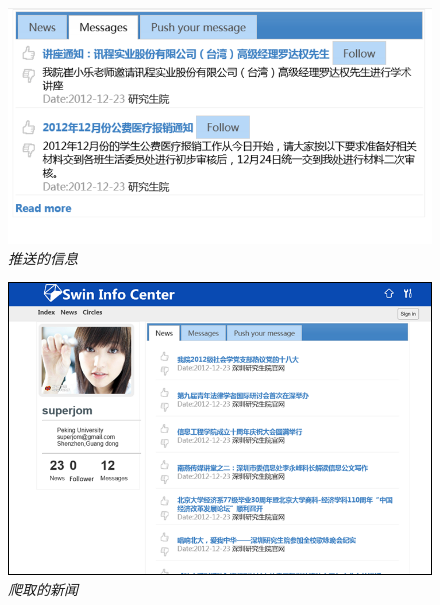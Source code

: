 \documentclass[a4paper]{ctexart}
\begin{document}
    \begin{figure}[htpb]
        \centering
        \includegraphics{File5.png}
        \caption{\small \sl 推送的信息}
        \label{fig:pushed-message}
    \end{figure}
    \begin{figure}[htpb]
        \centering
        \includegraphics{File6.png}
        \caption{\small \sl 爬取的新闻}
        \label{fig:website-news}
    \end{figure}
\end{document}
